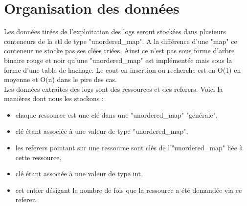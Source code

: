 \documentclass[a4paper]{article}
\begin{document}
\section{Organisation des données}\noindent

Les données tirées de l'exploitation des logs seront stockées dans plusieurs conteneurs de la stl de type "unordered\_map". A la différence d'une "map" ce conteneur ne stocke pas ses clées triées. Ainsi ce n'est pas sous forme d'arbre binaire rouge et noir qu'une "unordered\_map" est implémentée mais sous la forme d'une table de hachage. Le cout en insertion ou recherche est en O(1) en moyenne et O(n) dans le pire des cas. 
\\
Les données extraites des logs sont des ressources et des referers. Voici la manières dont nous les stockons :
\begin{itemize}[label=\textbullet]
\item chaque ressource est une clé dans une "unordered\_map" "générale",
\item clé étant associée à une valeur de type "unordered\_map",
\item les referers pointant sur une ressource sont clés de l'"unordered\_map" liée à cette ressource,
\item clé étant associée à une valeur de type int,
\item cet entier désigant le nombre de fois que la ressource a été demandée via ce referer.
\end{itemize}
\vspace*{\fill}
\end{document}
